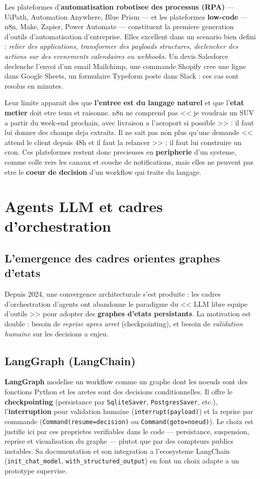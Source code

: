 \documentclass[12pt,a4paper,openany]{report}
\begin{document}
Les plateformes d'\textbf{automatisation robotisee des processus (RPA)} --- UiPath, Automation Anywhere, Blue Prism --- et les plateformes \textbf{low-code} --- n8n, Make, Zapier, Power Automate --- constituent la premiere generation d'outils d'automatisation d'entreprise. Elles excellent dans un scenario bien defini : \emph{relier des applications, transformer des payloads structures, declencher des actions sur des evenements calendaires ou webhooks}. Un devis Salesforce declenche l'envoi d'un email Mailchimp, une commande Shopify cree une ligne dans Google Sheets, un formulaire Typeform poste dans Slack : ces cas sont resolus en minutes.

Leur limite apparait des que \textbf{l'entree est du langage naturel} et que l'\textbf{etat metier} doit etre tenu et raisonne. n8n ne comprend pas << je voudrais un SUV a partir du week-end prochain, avec livraison a l'aeroport si possible >> : il faut lui donner des champs deja extraits. Il ne sait pas non plus qu'une demande << attend le client depuis 48h et il faut la relancer >> : il faut lui construire un cron. Ces plateformes restent donc precieuses en \textbf{peripherie} d'un systeme, comme colle vers les canaux et couche de notifications, mais elles ne peuvent pas etre le \textbf{coeur de decision} d'un workflow qui traite du langage.

\section{Agents LLM et cadres d'orchestration}

\subsection{L'emergence des cadres orientes graphes d'etats}
Depuis 2024, une convergence architecturale s'est produite : les cadres d'orchestration d'agents ont abandonne le paradigme du << LLM libre equipe d'outils >> pour adopter des \textbf{graphes d'etats persistants}. La motivation est double : besoin de \emph{reprise apres arret} (checkpointing), et besoin de \emph{validation humaine} sur les decisions a enjeu.

\subsection{LangGraph (LangChain)}
\textbf{LangGraph} modelise un workflow comme un graphe dont les noeuds sont des fonctions Python et les aretes sont des decisions conditionnelles. Il offre le \textbf{checkpointing} (persistance par \texttt{SqliteSaver}, \texttt{PostgresSaver}, etc.), l'\textbf{interruption} pour validation humaine (\texttt{interrupt(payload)}) et la reprise par commande (\texttt{Command(resume=decision)} ou \texttt{Command(goto=noeud)}). Le choix est justifie ici par ces proprietes verifiables dans le code --- persistance, suspension, reprise et visualisation du graphe --- plutot que par des compteurs publics instables. Sa documentation et son integration a l'ecosysteme LangChain (\texttt{init\_chat\_model}, \texttt{with\_structured\_output}) en font un choix adapte a un prototype supervise.
\end{document}

